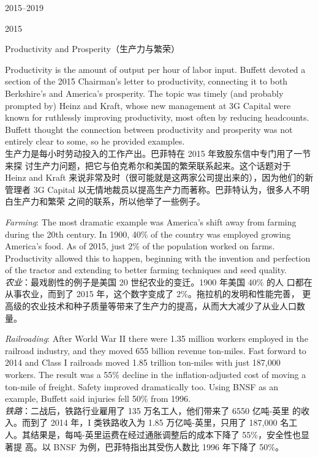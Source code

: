 \begin{chapter}{2015--2019}
\begin{section}{2015}
\begin{subsection}{Productivity and Prosperity（生产力与繁荣）}
\begin{verseparallel}
  {
    Productivity is the amount of output per hour of labor input. Buffett
    devoted a section of the 2015 Chairman's letter to productivity, connecting
    it to both Berkshire's and America's prosperity. The topic was timely (and
    probably prompted by) Heinz and Kraft, whose new management at 3G Capital
    were known for ruthlessly improving productivity, most often by reducing
    headcounts. Buffett thought the connection between productivity and
    prosperity was not entirely clear to some, so he provided examples. \\
  }
  {
    生产力是每小时劳动投入的工作产出。巴菲特在 2015 年致股东信中专门用了一节来探
    讨生产力问题，把它与伯克希尔和美国的繁荣联系起来。这个话题对于 Heinz and
    Kraft 来说非常及时（很可能就是这两家公司提出来的），因为他们的新管理者 3G
    Capital 以无情地裁员以提高生产力而著称。巴菲特认为，很多人不明白生产力和繁荣
    之间的联系，所以他举了一些例子。
  }
\end{verseparallel}

{\color{green}{此处应为列表项 \\}}

\begin{verseparallel}
  {
    \textit{Farming}: The most dramatic example was America's shift away
    from farming during the 20th century. In 1900, 40\% of the country
    was employed growing America's food. As of 2015, just 2\% of the
    population worked on farms. Productivity allowed this to happen,
    beginning with the invention and perfection of the tractor and
    extending to better farming techniques and seed quality. \\
  }
  {
    \textit{农业}：最戏剧性的例子是美国 20 世纪农业的变迁。1900 年美国 40\% 的人
    口都在从事农业，而到了 2015 年，这个数字变成了 2\%。拖拉机的发明和性能完善，
    更高级的农业技术和种子质量等带来了生产力的提高，从而大大减少了从业人口数量。
  }
\end{verseparallel}

\begin{verseparallel}
  {
    \textit{Railroading}: After World War II there were 1.35 million workers
    employed in the railroad industry, and they moved 655 billion revenue
    ton-miles. Fast forward to 2014 and Class I railroads moved 1.85 trillion
    ton-miles with just 187,000 workers. The result was a 55\% decline in the
    inflation-adjusted cost of moving a ton-mile of freight. Safety improved
    dramatically too. Using BNSF as an example, Buffett said injuries fell 50\%
    from 1996. \\
  }
  {
    \textit{铁路}：二战后，铁路行业雇用了 135 万名工人，他们带来了 6550 亿吨-英里
    的收入。而到了 2014 年，I 类铁路收入为 1.85 万亿吨-英里，只用了 187,000 名工
    人。其结果是，每吨-英里运费在经过通胀调整后的成本下降了 55\%，安全性也显著提
    高。以 BNSF 为例，巴菲特指出其受伤人数比 1996 年下降了 50\%。
  }
\end{verseparallel}


\end{subsection}
\end{section}
\end{chapter}
